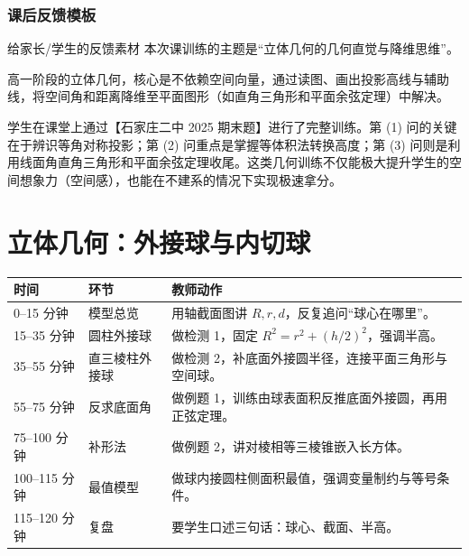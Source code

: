 \documentclass[11pt,a4paper]{ctexart}
\begin{document}
\section{课后反馈模板}

\begin{teachbox}{给家长/学生的反馈素材}
本次课训练的主题是“立体几何的几何直觉与降维思维”。\par
高一阶段的立体几何，核心是不依赖空间向量，通过读图、画出投影高线与辅助线，将空间角和距离降维至平面图形（如直角三角形和平面余弦定理）中解决。\par
学生在课堂上通过【石家庄二中 2025 期末题】进行了完整训练。第 (1) 问的关键在于辨识等角对称投影；第 (2) 问重点是掌握等体积法转换高度；第 (3) 问则是利用线面角直角三角形和平面余弦定理收尾。这类几何训练不仅能极大提升学生的空间想象力（空间感），也能在不建系的情况下实现极速拿分。
\end{teachbox}




\newpage
\part{立体几何：外接球与内切球}



\begin{tabularx}{\textwidth}{p{2.5cm}p{2.4cm}X}
\toprule
时间 & 环节 & 教师动作\\
\midrule
0--15 分钟 & 模型总览 & 用轴截面图讲 $R,r,d$，反复追问“球心在哪里”。\\ \hline
15--35 分钟 & 圆柱外接球 & 做检测 1，固定 $R^2=r^2+(h/2)^2$，强调半高。\\ \hline
35--55 分钟 & 直三棱柱外接球 & 做检测 2，补底面外接圆半径，连接平面三角形与空间球。\\ \hline
55--75 分钟 & 反求底面角 & 做例题 1，训练由球表面积反推底面外接圆，再用正弦定理。\\ \hline
75--100 分钟 & 补形法 & 做例题 2，讲对棱相等三棱锥嵌入长方体。\\ \hline
100--115 分钟 & 最值模型 & 做球内接圆柱侧面积最值，强调变量制约与等号条件。\\ \hline
115--120 分钟 & 复盘 & 要学生口述三句话：球心、截面、半高。\\
\bottomrule
\end{tabularx}
\end{document}
